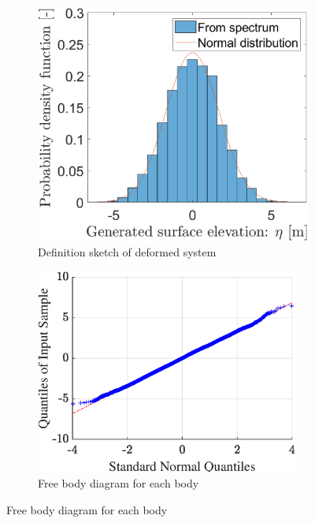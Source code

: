 \begin{figure}[htb]
\begin{subfigure}[t]{.5\textwidth}
    \centering
    \includegraphics[width=1\textwidth,trim=0cm 0cm 0.5cm 0cm, clip=true]{Figures/Plots/etaIFFTdist}
    \caption{Definition sketch of deformed system}
    \label{fig:MechanicalModel}
\end{subfigure}%
\begin{subfigure}[t]{.5\textwidth}
    \centering
    \includegraphics[width=0.95\textwidth,trim=0cm 0cm 0cm 0cm, clip=true]{Figures/Plots/etaIFFqqplot}
    \caption{Free body diagram for each body}
    \label{fig:MechanicalModelFBD}
\end{subfigure}
\end{figure}
